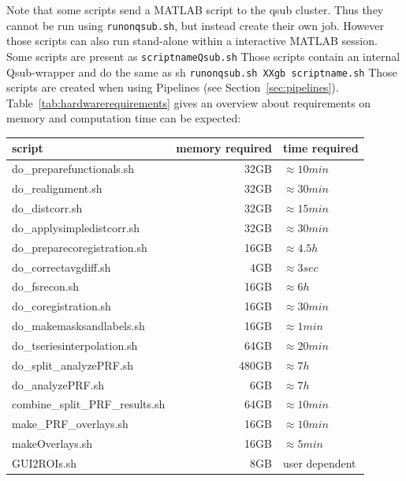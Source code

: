 \documentclass[12pt,a4paper]{scrartcl}
\begin{document}
\noindent Note that some scripts send a MATLAB script to the qsub cluster. Thus they cannot be run using \texttt{runonqsub.sh}, but instead create their own job. However those scripts can also run stand-alone within a interactive MATLAB session.\\

\noindent Some scripts are present as \texttt{scriptnameQsub.sh} Those scripts contain an internal Qsub-wrapper and do the same as sh \texttt{runonqsub.sh XXgb scriptname.sh} Those scripts are created when using Pipelines (see Section~\ref{sec:pipelines}).\\

\noindent Table~\ref{tab:hardwarerequirements} gives an overview about requirements on memory and computation time can be expected:

\begin{table}[h]
\centering
\begin{tabular}{l | r | l}
\toprule
script & memory required & time required\\\hline
	do\_preparefunctionals.sh & 32GB & $\approx 10min$ \\\hline
  do\_realignment.sh & 32GB & $\approx 30min$ \\\hline
  do\_distcorr.sh & 32GB & $\approx 15min$ \\\hline
  do\_applysimpledistcorr.sh & 32GB & $\approx 30min$ \\\hline
  do\_preparecoregistration.sh & 16GB & $\approx 4.5h$ \\\hline
  do\_correctavgdiff.sh & 4GB & $\approx 3sec$ \\\hline
	do\_fsrecon.sh & 16GB & $\approx 6h$ \\\hline
  do\_coregistration.sh & 16GB & $\approx 30min$ \\\hline
	do\_makemasksandlabels.sh & 16GB & $\approx 1min$ \\\hline
	do\_tseriesinterpolation.sh & 64GB & $\approx 20min$ \\\hline
	do\_split\_analyzePRF.sh & 480GB & $\approx 7h$ \\\hline
  do\_analyzePRF.sh & 6GB & $\approx 7h$ \\\hline
	combine\_split\_PRF\_results.sh & 64GB & $\approx 10min$ \\\hline
  make\_PRF\_overlays.sh & 16GB & $\approx 10min$ \\\hline
	makeOverlays.sh & 16GB & $\approx 5min$\\\hline
	GUI2ROIs.sh & 8GB & user dependent \\\hline

\end{tabular}
\end{table}
\end{document}
